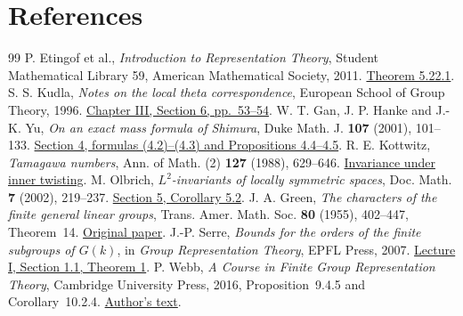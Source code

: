 \documentclass[a4paper,11pt]{article}
\theoremstyle{definition}
\theoremstyle{remark}
\numberwithin{equation}{section}
\begin{document}
\clearpage
\section{References}\label{nav:bibliography-XVIII}
\begingroup{}\begin{thebibliography}{99}\small
{} P. Etingof et al., \emph{Introduction to Representation Theory}, Student Mathematical Library 59, American Mathematical Society, 2011. \href{https://math.mit.edu/~etingof/representationtheorybook.pdf}{Theorem 5.22.1}.
 S. S. Kudla, \emph{Notes on the local theta correspondence}, European School of Group Theory, 1996. \href{https://www.math.toronto.edu/skudla/castle.pdf}{Chapter III, Section 6, pp.~53--54}.
 W. T. Gan, J. P. Hanke and J.-K. Yu, \emph{On an exact mass formula of Shimura}, Duke Math. J. \textbf{107} (2001), 101--133. \href{https://web.math.princeton.edu/~jonhanke/Web-02/Mass-Formula-of-Shimura/shimura-mass.pdf}{Section 4, formulas (4.2)--(4.3) and Propositions 4.4--4.5}.
 R. E. Kottwitz, \emph{Tamagawa numbers}, Ann. of Math. (2) \textbf{127} (1988), 629--646. \href{https://annals.math.princeton.edu/1988/127-3/p05}{Invariance under inner twisting}.
 M. Olbrich, \emph{\(L^2\)-invariants of locally symmetric spaces}, Doc. Math. \textbf{7} (2002), 219--237. \href{https://arxiv.org/pdf/math/0009039}{Section 5, Corollary 5.2}.
 J. A. Green, \emph{The characters of the finite general linear groups}, Trans. Amer. Math. Soc. \textbf{80} (1955), 402--447, Theorem~14. \href{https://doi.org/10.1090/S0002-9947-1955-0072878-2}{Original paper}.
 J.-P. Serre, \emph{Bounds for the orders of the finite subgroups of \(G(k)\)}, in \emph{Group Representation Theory}, EPFL Press, 2007. \href{https://arxiv.org/pdf/1011.0346}{Lecture I, Section 1.1, Theorem 1}.
 P. Webb, \emph{A Course in Finite Group Representation Theory}, Cambridge University Press, 2016, Proposition~9.4.5 and Corollary~10.2.4. \href{https://www-users.cse.umn.edu/~webb/RepBook/RepBookLatex.pdf}{Author's text}.
\end{thebibliography}\endgroup
\end{document}
